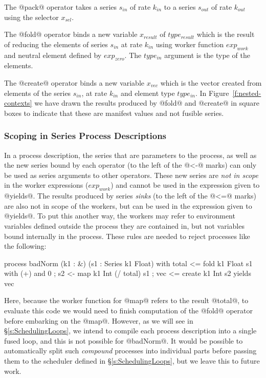 The @pack@ operator takes a series $s_{in}$ of rate $k_{in}$ to a series $s_{out}$ of rate $k_{out}$ using the selector $x_{sel}$. 

The @fold@ operator binds a new variable $x_{result}$ of $type_{result}$ which is the result of reducing the elements of series $s_{in}$ at rate $k_{in}$ using worker function $exp_{work}$ and neutral element defined by $exp_{zero}$. The $type_{in}$ argument is the type of the elements. 

The @create@ operator binds a new variable $x_{vec}$ which is the vector created from elements of the series $s_{in}$, at rate $k_{in}$ and element type $type_{in}$. In Figure~\ref{f:nested-contexts} we have drawn the results produced by @fold@ and @create@ in square boxes to indicate that these are manifest values and not fusible series. 


\subsubsection{Scoping in Series Process Descriptions}
\label{s:Scoping}
In a process description, the series that are parameters to the process, as well as the new series bound by each operator (to the left of the @<-@ marks) can only be used as series arguments to other operators. These new series are \emph{not in scope} in the worker expressions ($exp_{work}$) and cannot be used in the expression given to @yields@. The results produced by series \emph{sinks} (to the left of the @<=@ marks) are also not in scope of the workers, but can be used in the expression given to @yields@. To put this another way, the workers may refer to environment variables defined outside the process they are contained in, but not variables bound internally in the process. These rules are needed to reject processes like the following:

\begin{code}
  process badNorm (k1 : &) (s1 : Series k1 Float)
   with { total <= fold k1 Float s1 with (+) and 0
        ; s2    <- map  k1 Int  (/ total) s1
        ; vec   <= create k1 Int s2 }
   yields vec
\end{code}

Here, because the worker function for @map@ refers to the result @total@, to evaluate this code we would need to finish computation of the @fold@ operator before embarking on the @map@. However, as we will see in \S\ref{s:SchedulingLoops}, we intend to compile each process description into a single fused loop, and this is not possible for @badNorm@. It would be possible to automatically split such \emph{compound} processes into individual parts before passing them to the scheduler defined in \S\ref{s:SchedulingLoops}, but we leave this to future work.


